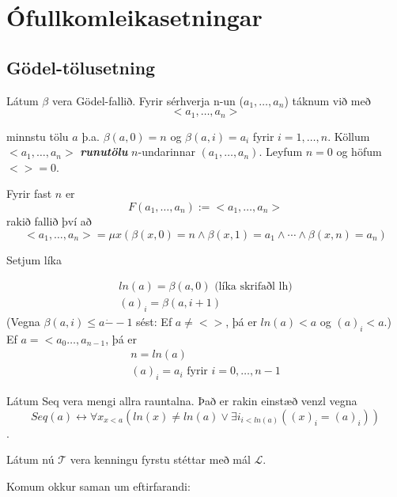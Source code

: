 \documentclass[12pt]{book}
\newcommand{\cT}{\mathcal{T}}
\newcommand{\cL}{\mathcal{L}}
\newcommand{\aan}{a_1, \dotsc, a_n}
\newcommand{\dda}{\dot{-}}
\newcommand{\emphs}[1]{\textbf{\emph{#1}}}
\begin{document}
\chapter{Ófullkomleikasetningar}

\section{Gödel-tölusetning}

Látum $\beta$ vera Gödel-fallið. Fyrir sérhverja 
n-un ($\aan$) táknum við með
\[< \aan > \]

minnstu tölu $a$ þ.a. $\beta(a,0) = n$ og 
$\beta(a,i) = a_i$ fyrir $i = 1, \dotsc, n$. Köllum
$<\aan>$ \emphs{runutölu} $n$-undarinnar
$(\aan)$. Leyfum $n=0$ og höfum $<> = 0$.

Fyrir fast $n$ er 
\[ F(\aan) := < \aan>\]
rakið fallið því að
\[< \aan> = \mu x(\beta(x,0) = n \wedge \beta(x,1) = a_1 \wedge \dotsb \wedge \beta(x,n) = a_n )\]

Setjum líka

\begin{gather*}
  ln(a) = \beta(a,0) \text{   (líka skrifaðl lh)} \\
  (a)_i = \beta(a,i+1)
\end{gather*}
(Vegna $\beta(a,i) \leq a \dda -1$ sést:
Ef $a \neq < >$, þá er $ln(a) < a$ og $(a)_i < a$.)
Ef $a = < a_0 \dotsc, a_{n-1}$, þá er
\begin{gather*}
  n = ln(a)\\
  (a)_i = a_i \text{ fyrir } i = 0, \dotsc, n-1
\end{gather*}

Látum Seq vera mengi allra rauntalna. Það er rakin einstæð venzl vegna
\[Seq(a) \leftrightarrow \forall x_{x < a} ( ln(x) \neq ln(a) \vee \exists i_{i < ln(a)} ((x)_i = (a)_i))\].

Látum nú $\cT$ vera kenningu fyrstu stéttar með mál $\cL$.

Komum okkur saman um eftirfarandi:
\end{document}
